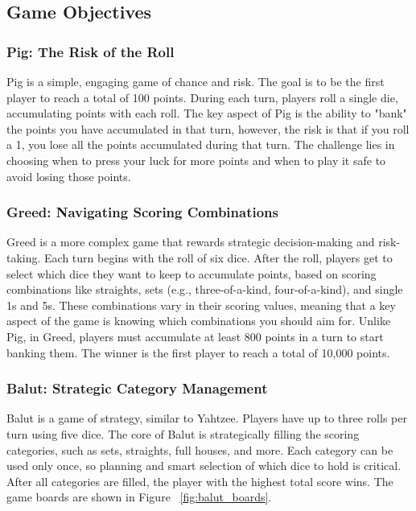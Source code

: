 \subsection{Game Objectives}

\subsubsection{Pig: The Risk of the Roll}

Pig is a simple, engaging game of chance and risk. The goal is to be the first player to reach a total of 100 points. During each turn, players roll a single die, accumulating points with each roll. The key aspect of Pig is the ability to "bank" the points you have accumulated in that turn, however, the risk is that if you roll a 1, you lose all the points accumulated during that turn. The challenge lies in choosing when to press your luck for more points and when to play it safe to avoid losing those points.

\subsubsection{Greed: Navigating Scoring Combinations}

Greed is a more complex game that rewards strategic decision-making and risk-taking. Each turn begins with the roll of six dice. After the roll, players get to select which dice they want to keep to accumulate points, based on scoring combinations like straights, sets (e.g., three-of-a-kind, four-of-a-kind), and single 1s and 5s. These combinations vary in their scoring values, meaning that a key aspect of the game is knowing which combinations you should aim for. Unlike Pig, in Greed, players must accumulate at least 800 points in a turn to start banking them. The winner is the first player to reach a total of 10,000 points.

\subsubsection{Balut: Strategic Category Management}

Balut is a game of strategy, similar to Yahtzee. Players have up to three rolls per turn using five dice. The core of Balut is strategically filling the scoring categories, such as sets, straights, full houses, and more. Each category can be used only once, so planning and smart selection of which dice to hold is critical. After all categories are filled, the player with the highest total score wins. The game boards are shown in Figure ~\ref{fig:balut_boards}.

